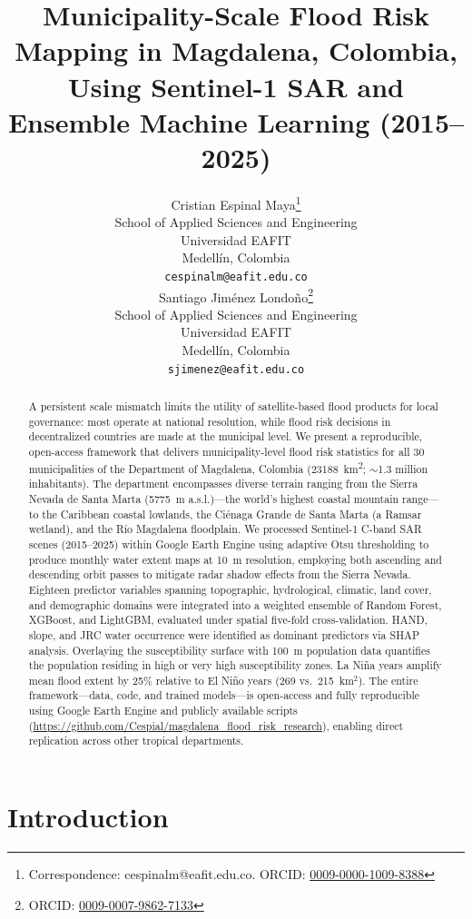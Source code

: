 \documentclass{article}
\title{Municipality-Scale Flood Risk Mapping in Magdalena, Colombia, Using Sentinel-1 SAR and Ensemble Machine Learning (2015--2025)}
\author{
  Cristian Espinal Maya\thanks{Correspondence: cespinalm@eafit.edu.co. ORCID: \href{https://orcid.org/0009-0000-1009-8388}{0009-0000-1009-8388}} \\
  School of Applied Sciences and Engineering\\
  Universidad EAFIT\\
  Medell\'in, Colombia \\
  \texttt{cespinalm@eafit.edu.co} \\
  \And
  Santiago Jim\'enez Londo\~no\thanks{ORCID: \href{https://orcid.org/0009-0007-9862-7133}{0009-0007-9862-7133}} \\
  School of Applied Sciences and Engineering\\
  Universidad EAFIT\\
  Medell\'in, Colombia \\
  \texttt{sjimenez@eafit.edu.co} \\
}
\begin{document}
\maketitle

\begin{abstract}
A persistent scale mismatch limits the utility of satellite-based flood products for local governance: most operate at national resolution, while flood risk decisions in decentralized countries are made at the municipal level. We present a reproducible, open-access framework that delivers municipality-level flood risk statistics for all 30 municipalities of the Department of Magdalena, Colombia (\SI{23188}{\kilo\metre\squared}; $\sim$1.3 million inhabitants). The department encompasses diverse terrain ranging from the Sierra Nevada de Santa Marta (\SI{5775}{\metre} a.s.l.)---the world's highest coastal mountain range---to the Caribbean coastal lowlands, the Ci\'enaga Grande de Santa Marta (a Ramsar wetland), and the R\'io Magdalena floodplain. We processed Sentinel-1 C-band SAR scenes (2015--2025) within Google Earth Engine using adaptive Otsu thresholding to produce monthly water extent maps at \SI{10}{\metre} resolution, employing both ascending and descending orbit passes to mitigate radar shadow effects from the Sierra Nevada. Eighteen predictor variables spanning topographic, hydrological, climatic, land cover, and demographic domains were integrated into a weighted ensemble of Random Forest, XGBoost, and LightGBM, evaluated under spatial five-fold cross-validation. HAND, slope, and JRC water occurrence were identified as dominant predictors via SHAP analysis. Overlaying the susceptibility surface with \SI{100}{\metre} population data quantifies the population residing in high or very high susceptibility zones. La Ni\~na years amplify mean flood extent by 25\% relative to El Ni\~no years (269 vs.\ 215~km$^2$). The entire framework---data, code, and trained models---is open-access and fully reproducible using Google Earth Engine and publicly available scripts (\url{https://github.com/Cespial/magdalena_flood_risk_research}), enabling direct replication across other tropical departments.
\end{abstract}


\section{Introduction}
\label{sec:introduction}
\end{document}
